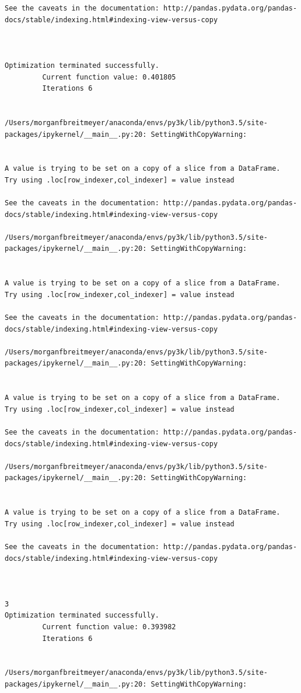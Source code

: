 \begin{lstlisting}
See the caveats in the documentation: http://pandas.pydata.org/pandas-docs/stable/indexing.html#indexing-view-versus-copy



Optimization terminated successfully.
         Current function value: 0.401805
         Iterations 6


/Users/morganfbreitmeyer/anaconda/envs/py3k/lib/python3.5/site-packages/ipykernel/__main__.py:20: SettingWithCopyWarning:


A value is trying to be set on a copy of a slice from a DataFrame.
Try using .loc[row_indexer,col_indexer] = value instead

See the caveats in the documentation: http://pandas.pydata.org/pandas-docs/stable/indexing.html#indexing-view-versus-copy

/Users/morganfbreitmeyer/anaconda/envs/py3k/lib/python3.5/site-packages/ipykernel/__main__.py:20: SettingWithCopyWarning:


A value is trying to be set on a copy of a slice from a DataFrame.
Try using .loc[row_indexer,col_indexer] = value instead

See the caveats in the documentation: http://pandas.pydata.org/pandas-docs/stable/indexing.html#indexing-view-versus-copy

/Users/morganfbreitmeyer/anaconda/envs/py3k/lib/python3.5/site-packages/ipykernel/__main__.py:20: SettingWithCopyWarning:


A value is trying to be set on a copy of a slice from a DataFrame.
Try using .loc[row_indexer,col_indexer] = value instead

See the caveats in the documentation: http://pandas.pydata.org/pandas-docs/stable/indexing.html#indexing-view-versus-copy

/Users/morganfbreitmeyer/anaconda/envs/py3k/lib/python3.5/site-packages/ipykernel/__main__.py:20: SettingWithCopyWarning:


A value is trying to be set on a copy of a slice from a DataFrame.
Try using .loc[row_indexer,col_indexer] = value instead

See the caveats in the documentation: http://pandas.pydata.org/pandas-docs/stable/indexing.html#indexing-view-versus-copy



3
Optimization terminated successfully.
         Current function value: 0.393982
         Iterations 6


/Users/morganfbreitmeyer/anaconda/envs/py3k/lib/python3.5/site-packages/ipykernel/__main__.py:20: SettingWithCopyWarning:



\end{lstlisting}
